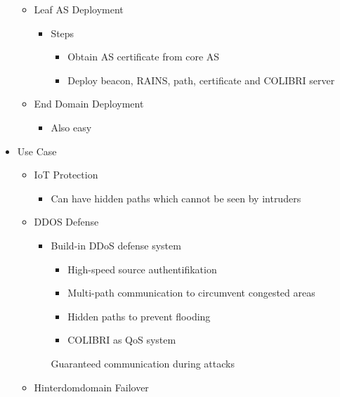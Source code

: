\begin{itemize}
\begin{itemize}
\begin{itemize}
                \end{itemize}
            \item Leaf AS Deployment
                \begin{itemize}
                    \item Steps
                        \begin{itemize}
                            \item Obtain AS certificate from core AS
                            \item Deploy beacon, RAINS, path, certificate and COLIBRI server
                        \end{itemize}
                \end{itemize}
            \item End Domain Deployment
                \begin{itemize}
                    \item Also easy
                \end{itemize}
        \end{itemize}
    \item Use Case
        \begin{itemize}
            \item IoT Protection
                \begin{itemize}
                    \item Can have hidden paths which cannot be seen by intruders
                \end{itemize}
            \item DDOS Defense
                \begin{itemize}
                    \item Build-in DDoS defense system
                        \begin{itemize}
                            \item High-speed source authentifikation
                            \item Multi-path communication to circumvent congested areas
                            \item Hidden paths to prevent flooding
                            \item COLIBRI as QoS system
                        \end{itemize}
                    \ipro Guaranteed communication during attacks
                \end{itemize}
            \item Hinterdomdomain Failover

\end{itemize}
\end{itemize}
